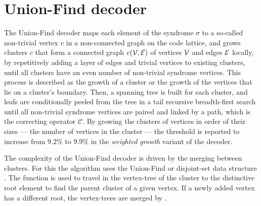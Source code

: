 \section{Union-Find decoder}\label{sec:unionfind}

The Union-Find decoder \cite{delfosse2017linear, delfosse2017almost} maps each element of the syndrome $\sigma$ to a so-called non-trivial vertex $v$ in a non-connected graph on the code lattice, and grows clusters $c$ that form a connected graph $c(\mathcal{V}, \mathcal{E})$ of vertices $\mathcal{V}$ and edges $\mathcal{E}$ locally, by repetitively adding a layer of edges and trivial vertices to existing clusters, until all clusters have an even number of non-trivial syndrome vertices. This process is described as the growth of a cluster or the growth of the vertices that lie on a cluster's boundary. Then, a spanning tree is built for each cluster, and leafs are conditionally peeled from the tree in a tail recursive breadth-first search until all non-trivial syndrome vertices are paired and linked by a path, which is the correcting operator $\mathcal{C}$. By growing the clusters of vertices in order of their sizes --- the number of vertices in the cluster --- the threshold is reported to increase from $9.2\%$ to $9.9\%$ in the \emph{weighted growth} variant of the decoder.

The complexity of the Union-Find decoder is driven by the merging between clusters. For this the algorithm uses the Union-Find or disjoint-set data structure \cite{tarjan1975efficiency}. The function  is used to travel in the vertex-tree of the cluster to the distinctive root element to find the parent cluster of a given vertex. If a newly added vertex has a different root, the vertex-trees are merged by . 